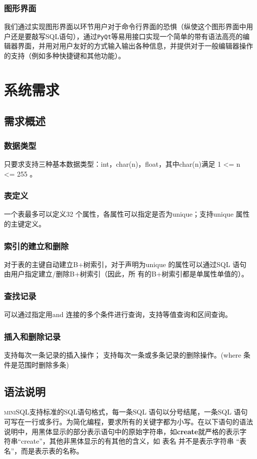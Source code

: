 \documentclass[UTF8]{ctexrep} %
\begin{document}
\subsection{图形界面}
我们通过实现图形界面以环节用户对于命令行界面的恐惧（纵使这个图形界面中用户还是要敲写SQL语句），通过\texttt{PyQt}等易用接口实现一个简单的带有语法高亮的编辑器界面，并用对用户友好的方式输入输出各种信息，并提供对于一般编辑器操作的支持（例如多种快捷键和其他功能）。

\chapter{系统需求}
\section{需求概述}
\subsection{数据类型}
只要求支持三种基本数据类型：int，char(n)，float，其中char(n)满足 1 <= n <= 255 。
\subsection{表定义}
一个表最多可以定义32 个属性，各属性可以指定是否为unique；支持unique 属性的主键定义。
\subsection{索引的建立和删除}
对于表的主键自动建立B+树索引，对于声明为unique 的属性可以通过SQL 语句由用户指定建立/删除B+树索引（因此，所
有的B+树索引都是单属性单值的）。
\subsection{查找记录}
可以通过指定用and 连接的多个条件进行查询，支持等值查询和区间查询。
\subsection{插入和删除记录}
支持每次一条记录的插入操作；
支持每次一条或多条记录的删除操作。(where 条件是范围时删除多条)

\section{语法说明}
\textsc{miniSQL}支持标准的SQL语句格式，每一条SQL 语句以分号结尾，一条SQL 语句可写在一行或多行。为简化编程，要求所有的关键字都为小写。在以下语句的语法说明中，用黑体显示的部分表示语句中的原始字符串，如\textbf{create}就严格的表示字符串“create”，其他非黑体显示的有其他的含义，如 表名 并不是表示字符串 “表名”，而是表示表的名称。
\end{document}
